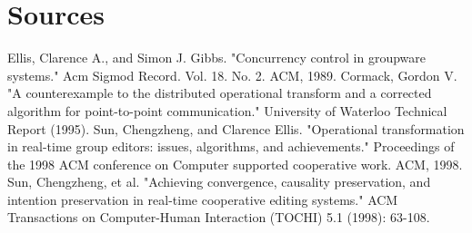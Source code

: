 \documentclass{article}
\begin{document}
\section{Sources}
\begin{enum}
  \list Ellis, Clarence A., and Simon J. Gibbs. "Concurrency control in groupware systems." Acm Sigmod Record. Vol. 18. No. 2. ACM, 1989.
  \list Cormack, Gordon V. "A counterexample to the distributed operational transform and a corrected algorithm for point-to-point communication." University of Waterloo Technical Report (1995).
  \list Sun, Chengzheng, and Clarence Ellis. "Operational transformation in real-time group editors: issues, algorithms, and achievements." Proceedings of the 1998 ACM conference on Computer supported cooperative work. ACM, 1998.
  \list Sun, Chengzheng, et al. "Achieving convergence, causality preservation, and intention preservation in real-time cooperative editing systems." ACM Transactions on Computer-Human Interaction (TOCHI) 5.1 (1998): 63-108.
\end{enum}
\end{document}
